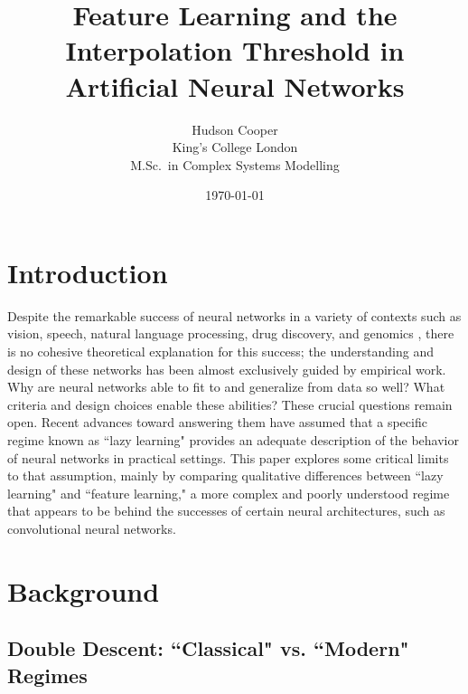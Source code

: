 \documentclass[a4paper, 12pt]{article}
\begin{document}
\title{\bf Feature Learning and the Interpolation Threshold in Artificial Neural Networks}
\author{
    Hudson Cooper\\ %
    King's College London\\
    M.Sc.\ in Complex Systems Modelling
}
\date{\today}

\begin{titlingpage}
\maketitle
\begin{abstract}
\lipsum[1]
\end{abstract}
\end{titlingpage}

\section{Introduction}
Despite the remarkable success of neural networks in a variety of contexts such as vision, speech, natural language processing, drug discovery, and genomics \cite{lecunDeepLearning2015}, there is no cohesive theoretical explanation for this success; the understanding and design of these networks has been almost exclusively guided by empirical work. \\

Why are neural networks able to fit to and generalize from data so well? What criteria and design choices enable these abilities? These crucial questions remain open. Recent advances toward answering them have assumed that a specific regime known as ``lazy learning" provides an adequate description of the behavior of neural networks in practical settings. This paper explores some critical limits to that assumption, mainly by comparing qualitative differences between ``lazy learning" and ``feature learning," a more complex and poorly understood regime that appears to be behind the successes of certain neural architectures, such as convolutional neural networks. 

\section{Background}

\subsection{Double Descent: ``Classical" vs. ``Modern" Regimes}
\end{document}
